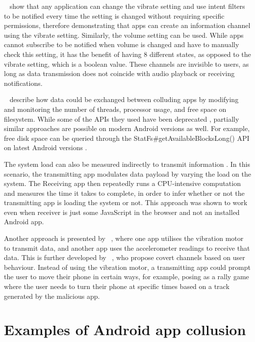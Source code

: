 \documentclass[article, oneside]{aaltoseries}
\newcommand{\TODO}[1]{\todo[inline]{#1}}
\begin{document}
\citeauthor{Schlegel2011}~\cite{Schlegel2011} show that any application can change the vibrate setting and use intent filters to be notified every time the setting is changed without requiring specific permissions, therefore demonstrating that apps can create an information channel using the vibrate setting.  Similarly, the volume setting can be used. While apps cannot subscribe to be notified when volume is changed and have to manually check this setting, it has the benefit of having 8 different states, as opposed to the vibrate setting, which is a boolean value. These channels are invisible to users, as long as data transmission does not coincide with audio playback or receiving notifications.

\citeauthor{Marforio2012}~\cite{Marforio2012} describe how data could be exchanged between colluding apps by modifying and monitoring the number of threads, processor usage, and free space on filesystem. While some of the APIs they used have been deprecated \cite{nn2017}, partially similar approaches are possible on modern Android versions as well. For example, free disk space can be queried through the StatFs\#getAvailableBlocksLong() API on latest Android versions \cite{AOSP2019reference}.\todo{}%

The system load can also be measured indirectly to transmit information \cite{Marforio2012}. In this scenario, the transmitting app modulates data payload by varying the load on the system. The Receiving app then repeatedly runs a CPU-intensive computation and measures the time it takes to complete, in order to infer whether or not the transmitting app is loading the system or not. This approach was shown to work even when receiver is just some JavaScript in the browser and not an installed Android app.

Another approach is presented by \citeauthor{Al-Haiqi2014}~\cite{Al-Haiqi2014}, where one app utilises the vibration motor to transmit data, and another app uses the accelerometer readings to receive that data. This is further developed by \citeauthor{Qi2018}~\cite{Qi2018}, who propose covert channels based on user behaviour. Instead of using the vibration motor, a transmitting app could prompt the user to move their phone in certain ways, for example, posing as a rally game where the user needs to turn their phone at specific times based on a track generated by the malicious app.
\\
\TODO{Add a subsection conclusion paragraph}

\section{Examples of Android app collusion}
\label{sec:examples}
\end{document}
